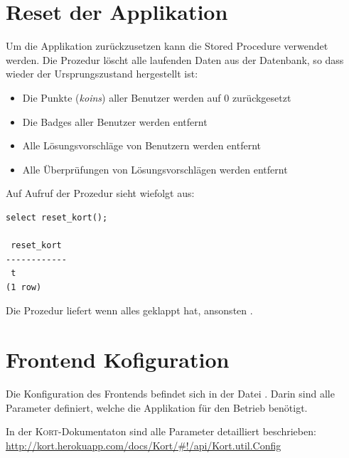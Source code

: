 \section{Reset der Applikation}
\label{kort-reset}
Um die Applikation zurückzusetzen kann die Stored Procedure  verwendet werden. 
Die Prozedur löscht alle laufenden Daten aus der Datenbank, so dass wieder der Ursprungszustand hergestellt ist:
\begin{itemize}
\item Die Punkte (\emph{koins}) aller Benutzer werden auf 0 zurückgesetzt
\item Die Badges aller Benutzer werden entfernt
\item Alle Lösungsvorschläge von Benutzern werden entfernt
\item Alle Überprüfungen von Lösungsvorschlägen werden entfernt
\end{itemize}

Auf Aufruf der Prozedur sieht wiefolgt aus:
\begin{lstlisting}[float, caption=Aufruf von reset\_kort() um die Applikation zurückzusetzen, label=kort-reset-cmd]
select reset_kort();

 reset_kort 
------------
 t
(1 row)
\end{lstlisting}

Die Prozedur liefert  wenn alles geklappt hat, ansonsten .

\section{Frontend Kofiguration}
\label{frontend-config}
Die Konfiguration des Frontends befindet sich in der Datei .
Darin sind alle Parameter definiert, welche die Applikation für den Betrieb benötigt.

In der \textsc{Kort}-Dokumentaton sind alle Parameter detailliert beschrieben: \url{http://kort.herokuapp.com/docs/Kort/#!/api/Kort.util.Config}